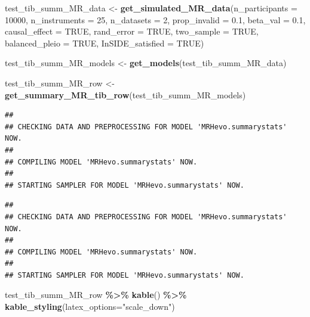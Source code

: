 \documentclass[
]{article}
\newenvironment{Shaded}{\begin{snugshade}}{\end{snugshade}}
\newcommand{\AttributeTok}[1]{\textcolor[rgb]{0.13,0.29,0.53}{#1}}
\newcommand{\ConstantTok}[1]{\textcolor[rgb]{0.56,0.35,0.01}{#1}}
\newcommand{\DecValTok}[1]{\textcolor[rgb]{0.00,0.00,0.81}{#1}}
\newcommand{\FloatTok}[1]{\textcolor[rgb]{0.00,0.00,0.81}{#1}}
\newcommand{\FunctionTok}[1]{\textcolor[rgb]{0.13,0.29,0.53}{\textbf{#1}}}
\newcommand{\NormalTok}[1]{#1}
\newcommand{\OtherTok}[1]{\textcolor[rgb]{0.56,0.35,0.01}{#1}}
\newcommand{\SpecialCharTok}[1]{\textcolor[rgb]{0.81,0.36,0.00}{\textbf{#1}}}
\newcommand{\StringTok}[1]{\textcolor[rgb]{0.31,0.60,0.02}{#1}}
\begin{document}
\begin{Shaded}
\begin{Highlighting}[]
\NormalTok{test\_tib\_summ\_MR\_data }\OtherTok{\textless{}{-}}  \FunctionTok{get\_simulated\_MR\_data}\NormalTok{(}\AttributeTok{n\_participants =} \DecValTok{10000}\NormalTok{,}
                                                \AttributeTok{n\_instruments =} \DecValTok{25}\NormalTok{,}
                                                \AttributeTok{n\_datasets =} \DecValTok{2}\NormalTok{,}
                                                \AttributeTok{prop\_invalid =} \FloatTok{0.1}\NormalTok{,}
                                                \AttributeTok{beta\_val =} \FloatTok{0.1}\NormalTok{,}
                                                \AttributeTok{causal\_effect =} \ConstantTok{TRUE}\NormalTok{,}
                                                \AttributeTok{rand\_error =} \ConstantTok{TRUE}\NormalTok{,}
                                                \AttributeTok{two\_sample =} \ConstantTok{TRUE}\NormalTok{,}
                                                \AttributeTok{balanced\_pleio =} \ConstantTok{TRUE}\NormalTok{,}
                                                \AttributeTok{InSIDE\_satisfied =} \ConstantTok{TRUE}\NormalTok{)}

\NormalTok{test\_tib\_summ\_MR\_models }\OtherTok{\textless{}{-}} \FunctionTok{get\_models}\NormalTok{(test\_tib\_summ\_MR\_data)}

\NormalTok{test\_tib\_summ\_MR\_row }\OtherTok{\textless{}{-}} \FunctionTok{get\_summary\_MR\_tib\_row}\NormalTok{(test\_tib\_summ\_MR\_models)}
\end{Highlighting}
\end{Shaded}

\begin{verbatim}
## 
## CHECKING DATA AND PREPROCESSING FOR MODEL 'MRHevo.summarystats' NOW.
## 
## COMPILING MODEL 'MRHevo.summarystats' NOW.
## 
## STARTING SAMPLER FOR MODEL 'MRHevo.summarystats' NOW.
\end{verbatim}

\begin{verbatim}
## 
## CHECKING DATA AND PREPROCESSING FOR MODEL 'MRHevo.summarystats' NOW.
## 
## COMPILING MODEL 'MRHevo.summarystats' NOW.
## 
## STARTING SAMPLER FOR MODEL 'MRHevo.summarystats' NOW.
\end{verbatim}

\begin{Shaded}
\begin{Highlighting}[]
\NormalTok{test\_tib\_summ\_MR\_row }\SpecialCharTok{\%\textgreater{}\%} 
  \FunctionTok{kable}\NormalTok{() }\SpecialCharTok{\%\textgreater{}\%} 
  \FunctionTok{kable\_styling}\NormalTok{(}\AttributeTok{latex\_options=}\StringTok{"scale\_down"}\NormalTok{)}
\end{Highlighting}
\end{Shaded}
\end{document}
